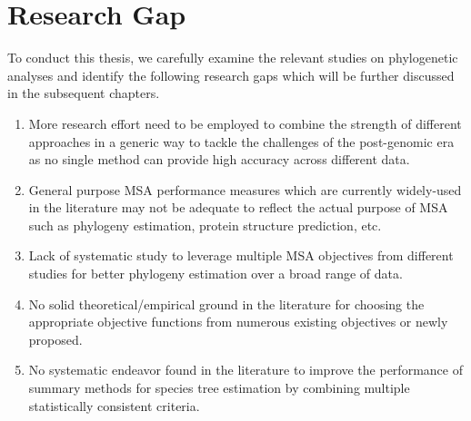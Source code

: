 \section{Research Gap}
To conduct this thesis, we carefully examine the relevant studies on phylogenetic analyses and identify the following research gaps which will be further discussed in the subsequent chapters.
\begin{enumerate}
	\item  More research effort need to be employed to combine the strength of different approaches in a generic way to tackle the challenges of the post-genomic era as no single method can provide high accuracy across different data.
	
	
	\item  General purpose MSA performance measures which are currently widely-used in the literature may not be adequate to reflect the actual purpose of MSA such as phylogeny estimation, protein structure prediction, etc.
	
	
	\item  Lack of systematic study to leverage multiple MSA objectives from different studies for better phylogeny estimation over a broad range of data.
	
	
	\item  No solid theoretical/empirical ground in the literature for choosing the appropriate objective functions from numerous existing objectives  or newly proposed.
	
	
	\item No systematic endeavor found in the literature to improve the performance of summary methods for species tree estimation by combining multiple statistically consistent criteria.
\end{enumerate}

